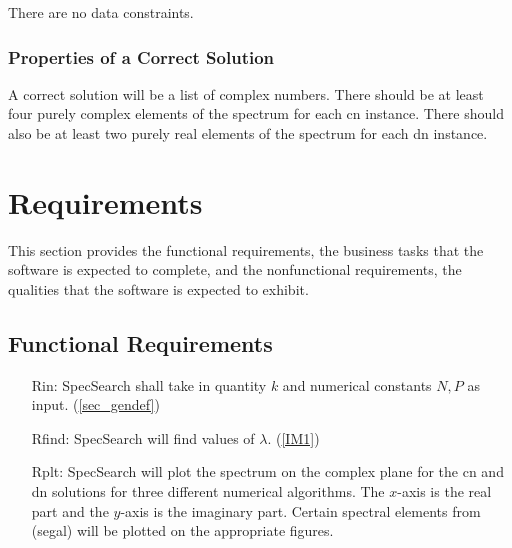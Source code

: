 \documentclass[12pt]{article}
\begin{document}
There are no data constraints. 

\subsubsection{Properties of a Correct Solution} \label{sec_CorrectSolution}

\noindent
A correct solution will be a list of complex numbers. There should be at least 
four purely complex elements of the spectrum for each cn instance. There should 
also 
be at least two purely real elements of the spectrum for each dn instance. 

\section{Requirements}

This section provides the functional requirements, the business tasks that the
software is expected to complete, and the nonfunctional requirements, the
qualities that the software is expected to exhibit.

\subsection{Functional Requirements}

\noindent \begin{itemize}

\item[Rin:] SpecSearch shall take in quantity $k$ and numerical constants 
$N,P$ as input. (\ref{sec_gendef})

\item[Rfind:] SpecSearch 
will find values of $\lambda$. (\ref{IM1})

\item[Rplt:] SpecSearch will plot the spectrum on the complex plane for the cn 
and dn solutions for three different numerical algorithms. The 
$x$-axis is the real part and the $y$-axis is the imaginary part. Certain 
spectral elements from (segal) will be plotted on the appropriate figures.


\end{itemize}
\end{document}

